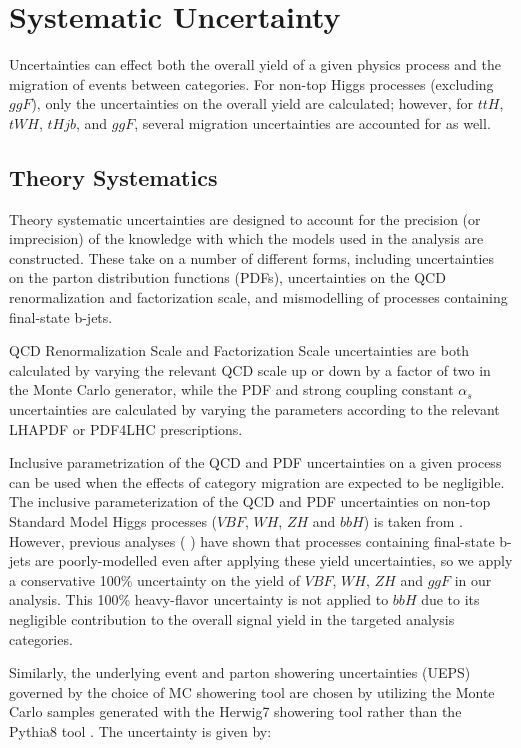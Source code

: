 \section{Systematic Uncertainty}

Uncertainties can effect both the overall yield of a given physics process and the migration of events between categories. For non-top Higgs processes (excluding $ggF$), only the uncertainties on the overall yield are calculated; however, for $ttH$, $tWH$, $tHjb$, and $ggF$, several migration uncertainties are accounted for as well.

\subsection{Theory Systematics}

Theory systematic uncertainties are designed to account for the precision (or imprecision) of the knowledge with which the models used in the analysis are constructed. These take on a number of different forms, including uncertainties on the parton distribution functions (PDFs), uncertainties on the QCD renormalization and factorization scale, and mismodelling of processes containing final-state b-jets.

QCD Renormalization Scale and Factorization Scale uncertainties are both calculated by varying the relevant QCD scale up or down by a factor of two in the Monte Carlo generator, while the PDF and strong coupling constant $\alpha_{s}$ uncertainties are calculated by varying the parameters according to the relevant LHAPDF \cite{LHAPDF} or PDF4LHC \cite{PDF4LHC} prescriptions.

Inclusive parametrization of the QCD and PDF uncertainties on a given process can be used when the effects of category migration are expected to be negligible. The inclusive parameterization of the QCD and PDF uncertainties on non-top Standard Model Higgs processes ($VBF$, $WH$, $ZH$ and $bbH$) is taken from \cite{YellowReport4}. However, previous analyses (\cite{Wb} \cite{Zb} \cite{ttbb} \cite{HZZ4l}) have shown that  processes containing final-state b-jets are poorly-modelled even after applying these yield uncertainties, so we apply a conservative 100\% uncertainty on the yield of $VBF$, $WH$, $ZH$ and $ggF$ in our analysis. This 100\% heavy-flavor uncertainty is not applied to $bbH$ due to its negligible contribution to the overall signal yield in the targeted analysis categories.

Similarly, the underlying event and parton showering uncertainties (UEPS) governed by the choice of MC showering tool are chosen by utilizing the Monte Carlo samples generated with the Herwig7 \cite{Herwig} showering tool rather than the Pythia8 tool \cite{Pythia8.2}. The uncertainty is given by:

